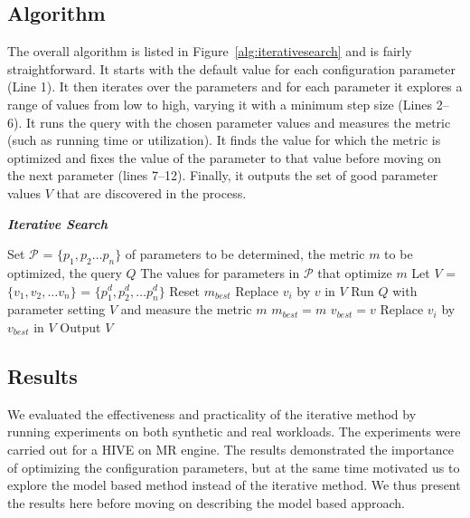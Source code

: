 \subsection{Algorithm}
The overall algorithm is listed in Figure~\ref{alg:iterativesearch} and is fairly straightforward. It starts with the default value for each configuration parameter (Line 1). It then iterates over the parameters and for each parameter it explores a range of values from low to high, varying it with a minimum step size (Lines 2--6). It runs the query with the chosen parameter values and measures the metric (such as running time or utilization). It finds the value for which the metric is optimized and fixes the value of the parameter to that value before moving on the next parameter (lines 7--12). Finally, it outputs the set of good parameter values $V$ that are discovered in the process.
\renewcommand{\algorithmicrequire}{\textbf{Input:}}
\renewcommand{\algorithmicensure}{\textbf{Output:}}
\renewcommand{\algorithmiccomment}[1]{// #1}
\begin{algorithm}[h]
	\caption{\bf \textit{Iterative Search}}
	\label{alg:iterativesearch}
	\begin{algorithmic}[1]
		\footnotesize
		\REQUIRE Set $\mathcal{P}$ = $\{p_1, p_2 \ldots p_n\}$ of parameters to be determined, the metric $m$ to be optimized, the query $Q$
		\ENSURE The values for parameters in $\mathcal{P}$ that optimize $m$
		\STATE Let $V$ = $\{v_1, v_2, \ldots v_n\}$ = $\{p_1^d, p_2^d, \ldots p_n^d\}$
			\STATE Reset $m_{best}$
				\STATE Replace $v_i$ by $v$ in $V$
				\STATE Run $Q$ with parameter setting $V$ and measure the metric $m$
					\STATE $m_{best} = m$
					\STATE $v_{best} = v$
				\ENDIF
			\ENDFOR
			\STATE Replace $v_i$ by $v_{best}$ in $V$ 			
		\ENDFOR
		\RETURN Output $V$
    \end{algorithmic}
\end{algorithm}
  
\subsection{Results}
We evaluated the effectiveness and practicality of the iterative method by running experiments on both synthetic and real workloads. The experiments were carried out for a HIVE on MR engine. The results demonstrated the importance of optimizing the configuration parameters, but at the same time motivated us to explore the model based method instead of the iterative method. We thus present the results here before moving on describing the model based approach.

